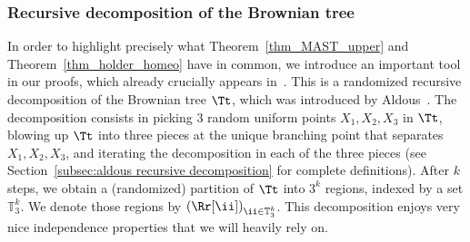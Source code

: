 \subsubsection*{Recursive decomposition of the Brownian tree}
In order to highlight precisely what Theorem~\ref{thm_MAST_upper} and Theorem~\ref{thm_holder_homeo} have in common, we introduce an important tool in our proofs, which already crucially appears in~\cite{aldous_largest_2022}.
This is a randomized recursive decomposition of the Brownian tree $\Tt$, which was introduced by Aldous~\cite{aldous_recursive_1994}.
The decomposition consists in picking $3$ random uniform points $X_1, X_2, X_3$ in $\Tt$, blowing up $\Tt$ into three pieces at the unique branching point that separates $X_1, X_2, X_3$, and iterating the decomposition in each of the three pieces (see Section~\ref{subsec:aldous recursive decomposition} for complete definitions).
After $k$ steps, we obtain a (randomized) partition of $\Tt$ into $3^k$ regions, indexed by a set $\mathbb{T}_3^k$.
We denote those regions by $\left( \Rr[\ii] \right)_{\ii \in \mathbb{T}_3^k}$.
This decomposition enjoys very nice independence properties that we will heavily rely on.

